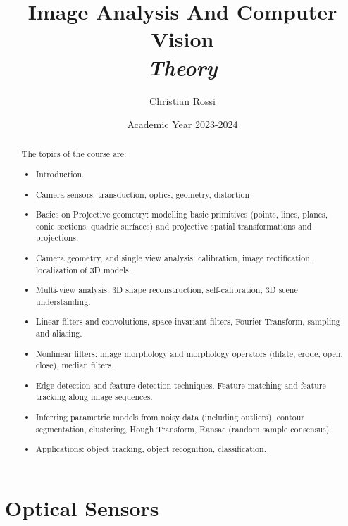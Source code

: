 \documentclass[12pt, a4paper]{report}
\title{Image Analysis And Computer Vision \\ \textit{Theory}}
\author{Christian Rossi}
\date{Academic Year 2023-2024}
\begin{document}
\maketitle

\newpage

\begin{abstract}
    The topics of the course are: 
    \begin{itemize}
        \item Introduction.
        \item Camera sensors: transduction, optics, geometry, distortion
        \item Basics on Projective geometry: modelling basic primitives (points, lines, planes, conic sections, quadric surfaces) and projective spatial transformations and  projections.
        \item Camera geometry, and single view analysis: calibration, image rectification, localization of 3D models.
        \item Multi-view analysis: 3D shape reconstruction, self-calibration, 3D scene understanding.
        \item Linear filters and convolutions, space-invariant filters, Fourier Transform, sampling and aliasing. 
        \item Nonlinear filters: image morphology and morphology operators (dilate, erode, open, close), median filters.
        \item Edge detection and feature detection techniques. Feature matching and feature tracking along image sequences.
        \item Inferring parametric models from noisy data (including outliers), contour segmentation, clustering, Hough Transform, Ransac (random sample consensus). 
        \item Applications: object tracking, object recognition, classification.
    \end{itemize}
\end{abstract}

\newpage

\tableofcontents

\newpage

\chapter{Optical Sensors}
\end{document}
